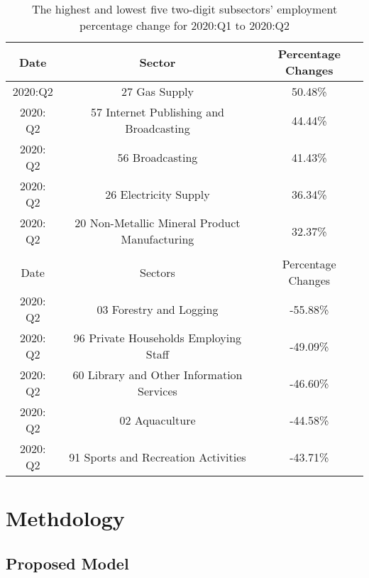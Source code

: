 \documentclass{monashthesis}
\begin{document}
\begin{table}
\begin{center}
\begin{tabular}{ccc}
\hline
Date     & Sector                                        & Percentage Changes \\
\hline
2020:Q2  & 27 Gas Supply                                 & 50.48\%                                \\
2020: Q2 & 57 Internet Publishing and Broadcasting       & 44.44\%                                \\
2020: Q2 & 56 Broadcasting                               & 41.43\%                                \\
2020: Q2 & 26 Electricity Supply                         & 36.34\%                                \\
2020: Q2 & 20 Non-Metallic Mineral Product Manufacturing & 32.37\% 
                 \\
                 \\
                 \hline
Date     &  Sectors                                      &Percentage Changes\\
                 \hline
2020: Q2 & 03 Forestry and Logging                   &-55.88\%  
                 \\
2020: Q2 & 96 Private Households Employing Staff     & -49.09\% 
                 \\
2020: Q2 & 60 Library and Other Information Services & -46.60\% 
                 \\
2020: Q2 & 02 Aquaculture                                & -44.58\%  
                 \\
2020: Q2 & 91 Sports and Recreation Activities           & -43.71\%
\end{tabular}
\end{center}
\caption{The highest and lowest five two-digit subsectors' employment percentage change for 2020:Q1 to 2020:Q2 }
\label{tab:comp}
\end{table}

\clearpage

\hypertarget{methdology}{%
\chapter{Methdology}\label{methdology}}

\hypertarget{proposed-model}{%
\section{Proposed Model}\label{proposed-model}}
\end{document}
